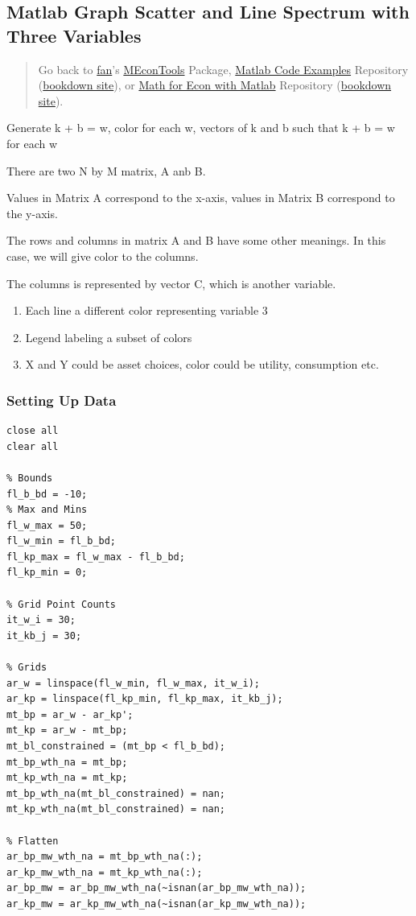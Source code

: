 \documentclass[
]{book}
\begin{document}
\hypertarget{matlab-graph-scatter-and-line-spectrum-with-three-variables}{%
\subsection{Matlab Graph Scatter and Line Spectrum with Three Variables}\label{matlab-graph-scatter-and-line-spectrum-with-three-variables}}

\begin{quote}
Go back to \href{http://fanwangecon.github.io/}{fan}'s \href{https://fanwangecon.github.io/MEconTools/}{MEconTools} Package, \href{https://fanwangecon.github.io/M4Econ/}{Matlab Code Examples} Repository (\href{https://fanwangecon.github.io/M4Econ/bookdown}{bookdown site}), or \href{https://fanwangecon.github.io/Math4Econ/}{Math for Econ with Matlab} Repository (\href{https://fanwangecon.github.io/Math4Econ/bookdown}{bookdown site}).
\end{quote}

Generate k + b = w, color for each w, vectors of k and b such that k + b
= w for each w

There are two N by M matrix, A anb B.

Values in Matrix A correspond to the x-axis, values in Matrix B
correspond to the y-axis.

The rows and columns in matrix A and B have some other meanings. In this
case, we will give color to the columns.

The columns is represented by vector C, which is another variable.

\begin{enumerate}
\def\labelenumi{\arabic{enumi}.}
\item
  Each line a different color representing variable 3
\item
  Legend labeling a subset of colors
\item
  X and Y could be asset choices, color could be utility, consumption
  etc.
\end{enumerate}

\hypertarget{setting-up-data}{%
\subsubsection{Setting Up Data}\label{setting-up-data}}

\begin{verbatim}
close all
clear all

% Bounds
fl_b_bd = -10;
% Max and Mins
fl_w_max = 50;
fl_w_min = fl_b_bd;
fl_kp_max = fl_w_max - fl_b_bd;
fl_kp_min = 0;

% Grid Point Counts
it_w_i = 30;
it_kb_j = 30;

% Grids
ar_w = linspace(fl_w_min, fl_w_max, it_w_i);
ar_kp = linspace(fl_kp_min, fl_kp_max, it_kb_j);
mt_bp = ar_w - ar_kp';
mt_kp = ar_w - mt_bp;
mt_bl_constrained = (mt_bp < fl_b_bd);
mt_bp_wth_na = mt_bp;
mt_kp_wth_na = mt_kp;
mt_bp_wth_na(mt_bl_constrained) = nan;
mt_kp_wth_na(mt_bl_constrained) = nan;

% Flatten
ar_bp_mw_wth_na = mt_bp_wth_na(:);
ar_kp_mw_wth_na = mt_kp_wth_na(:);
ar_bp_mw = ar_bp_mw_wth_na(~isnan(ar_bp_mw_wth_na));
ar_kp_mw = ar_kp_mw_wth_na(~isnan(ar_kp_mw_wth_na));
\end{verbatim}
\end{document}
